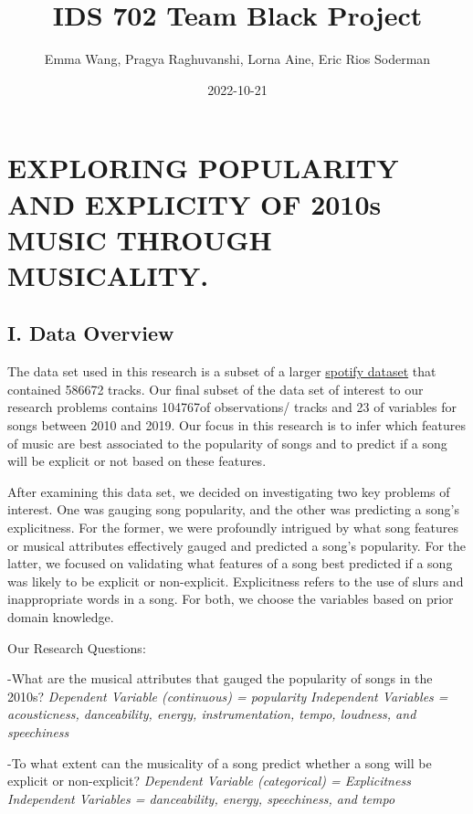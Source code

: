 \documentclass[
]{article}
\title{IDS 702 Team Black Project}
\author{Emma Wang, Pragya Raghuvanshi, Lorna Aine, Eric Rios Soderman}
\date{2022-10-21}
\begin{document}
\maketitle

\hypertarget{exploring-popularity-and-explicity-of-2010s-music-through-musicality.}{%
\section{EXPLORING POPULARITY AND EXPLICITY OF 2010s MUSIC THROUGH
MUSICALITY.}\label{exploring-popularity-and-explicity-of-2010s-music-through-musicality.}}

\hypertarget{i.-data-overview}{%
\subsection{I. Data Overview}\label{i.-data-overview}}

The data set used in this research is a subset of a larger
\href{https://www.kaggle.com/datasets/yamaerenay/spotify-dataset-19212020-600k-tracks}{spotify
dataset} that contained 586672 tracks. Our final subset of the data set
of interest to our research problems contains 104767of observations/
tracks and 23 of variables for songs between 2010 and 2019. Our focus in
this research is to infer which features of music are best associated to
the popularity of songs and to predict if a song will be explicit or not
based on these features.

After examining this data set, we decided on investigating two key
problems of interest. One was gauging song popularity, and the other was
predicting a song's explicitness. For the former, we were profoundly
intrigued by what song features or musical attributes effectively gauged
and predicted a song's popularity. For the latter, we focused on
validating what features of a song best predicted if a song was likely
to be explicit or non-explicit. Explicitness refers to the use of slurs
and inappropriate words in a song. For both, we choose the variables
based on prior domain knowledge.

Our Research Questions:

-What are the musical attributes that gauged the popularity of songs in
the 2010s? \emph{Dependent Variable (continuous) = popularity}
\emph{Independent Variables = acousticness, danceability, energy,
instrumentation, tempo, loudness, and speechiness}

-To what extent can the musicality of a song predict whether a song will
be explicit or non-explicit? \emph{Dependent Variable (categorical) =
Explicitness} \emph{Independent Variables = danceability, energy,
speechiness, and tempo}
\end{document}

